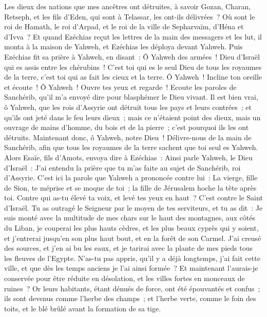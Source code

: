 \begin{multicols}{2}
Les dieux des nations que mes ancêtres ont détruites, à savoir Gozan, Charan, Retseph, et les fils d'Eden, qui sont à Telassar, les ont-ils délivrées~?
Où sont le roi de Hamath, le roi d'Arpad, et le roi de la ville de Sepharvaïm, d'Héna et d'Ivva~?
Et quand Ezéchias reçut les lettres de la main des messagers et les lut, il monta à la maison de Yahweh, et Ezéchias les déploya devant Yahweh.
Puis Ezéchias fit sa prière à Yahweh, en disant~:
Ô Yahweh des armées~! Dieu d'Israël qui es assis entre les chérubins~! C'est toi qui es le seul Dieu de tous les royaumes de la terre, c'est toi qui as fait les cieux et la terre.
Ô Yahweh~! Incline ton oreille et écoute~! Ô Yahweh~! Ouvre tes yeux et regarde~! Ecoute les paroles de Sanchérib, qu'il m'a envoyé dire pour blasphémer le Dieu vivant.
Il est bien vrai, ô Yahweh, que les rois d'Assyrie ont détruit tous les pays et leurs contrées~;
et qu'ils ont jeté dans le feu leurs dieux~; mais ce n'étaient point des dieux, mais un ouvrage de mains d'homme, du bois et de la pierre~; c'est pourquoi ils les ont détruits.
Maintenant donc, ô Yahweh, notre Dieu~! Délivre-nous de la main de Sanchérib, afin que tous les royaumes de la terre sachent que toi seul es Yahweh.
Alors Esaïe, fils d'Amots, envoya dire à Ezéchias~: Ainsi parle Yahweh, le Dieu d'Israël~: J'ai entendu la prière que tu m'as faite au sujet de Sanchérib, roi d'Assyrie.
C'est ici la parole que Yahweh a prononcée contre lui~: La vierge, fille de Sion, te méprise et se moque de toi~; la fille de Jérusalem hoche la tête après toi.
Contre qui as-tu élevé ta voix, et levé tes yeux en haut~? C'est contre le Saint d'Israël.
Tu as outragé le Seigneur par le moyen de tes serviteurs, et tu as dit~: Je suis monté avec la multitude de mes chars sur le haut des montagnes, aux côtés du Liban, je couperai les plus hauts cèdres, et les plus beaux cyprès qui y soient, et j'entrerai jusqu'en son plus haut bout, et en la forêt de son Carmel.
J'ai creusé des sources, et j'en ai bu les eaux, et je tarirai avec la plante de mes pieds tous les fleuves de l'Egypte.
N'as-tu pas appris, qu'il y a déjà longtemps, j'ai fait cette ville, et que dès les temps anciens je l'ai ainsi formée~? Et maintenant l'aurais-je conservée pour être réduite en désolation, et les villes fortes en monceaux de ruines~?
Or leurs habitants, étant dénués de force, ont été épouvantés et confus~; ils sont devenus comme l'herbe des champs~; et l'herbe verte, comme le foin des toits, et le blé brûlé avant la formation de sa tige.

\end{multicols}
